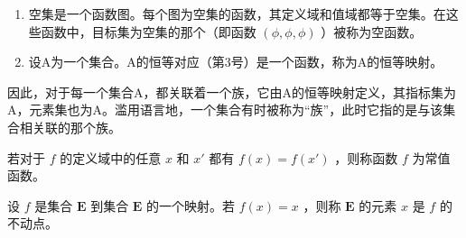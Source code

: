 
\begin{enumerate}
\def\labelenumi{(\arabic{enumi})}
\item
  空集是一个函数图。每个图为空集的函数，其定义域和值域都等于空集。在这些函数中，目标集为空集的那个（即函数 \((\phi, \phi, \phi)\) ）被称为空函数。
\item
  设A为一个集合。A的恒等对应（第3号）是一个函数，称为A的恒等映射。
\end{enumerate}

因此，对于每一个集合A，都关联着一个族，它由A的恒等映射定义，其指标集为A，元素集也为A。滥用语言地，一个集合有时被称为“族”，此时它指的是与该集合相关联的那个族。

若对于 \(f\) 的定义域中的任意 \(x\) 和 \(x'\) 都有 \(f(x) = f(x')\) ，则称函数 \(f\) 为常值函数。

设 \(f\) 是集合 \(\mathbf{E}\) 到集合 \(\mathbf{E}\) 的一个映射。若 \(f(x) = x\) ，则称 \(\mathbf{E}\) 的元素 \(x\) 是 \(f\) 的不动点。

